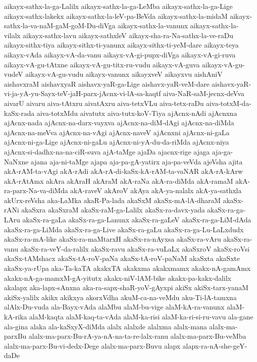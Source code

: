 {aikayx-sathx-la-ga-Lalilx
aikayx-sathx-la-ga-LeMba
aikayx-sathx-la-ga-Lige
aikayx-sathx-lakekx
aikayx-sathx-la-leV-pa-BeVda
aikayx-sathx-la-midaM
aikayx-sathx-la-va-naM-gaM-goM-Du-diVga
aikayx-sathx-la-vanunx
aikayx-sathx-la-vilalx
aikayx-sathx-lavu
aikayx-sathxleV
aikayx-sha-ra-Na-sathx-la-ve-raDu
aikayx-sithx-tiya
aikayx-sithx-ti-yanunx
aikayx-sithx-ti-yeM-dare
aikayx-teya
aikayx-vAda
aikayx-vA-da-vanu
aikayx-vA-gi-pupx-diVga
aikayx-vA-gi-ruva
aikayx-vA-gu-tAtxne
aikayx-vA-gu-titx-ru-vudu
aikayx-vA-guva
aikayx-vA-gu-vudeV
aikayx-vA-gu-vudu
aikayx-vanunx
aikayxveV
aikayxvu
aishAniV
aishavxraM
aishavxyaR
aishavx-yaR-ga-Lige
aishavx-yaR-veM-dare
aishavx-yaR-vi-ja-yA-yu-Sayx-teV-jaH-parx-jAcnx-vi-lA-sa-kaqtf
aiva-NaR-saM-jecnx-deVva
aivarU
aivaru
aiva-tAtxru
aivatAxru
aiva-tetxVLu
aiva-tetx-raDu
aiva-totxM-da-kaSx-rada
aiva-totxMdu
aivatutx
aiva-tutx-koV-Tiya
ajAcnx-nAdi
ajAcnxna
ajAcnx-nada
ajAcnx-na-darx-vayxva
ajAcnx-na-diM-dAgi
ajAcnx-na-diMda
ajAcnx-na-meVva
ajAcnx-na-vAgi
ajAcnx-naveV
ajAcnxni
ajAcnx-ni-gaLa
ajAcnx-ni-ga-Lige
ajAcnx-ni-gaLu
ajAcnx-ni-yA-du-da-riMda
ajAcnx-niya
ajAcnx-si-dadhx-na-na-ciR-suva
ajA-taMge
ajaDa
ajacnx-rige
ajaga
aja-ga-NaNxne
ajana
aja-ni-taMge
ajapa
aja-pa-gA-yatirx
aja-pa-veVda
ajeVsha
ajita
akA-rAM-ta-vAgi
akA-rAdi
akA-rA-di-kaSx-kA-rAM-ta-vaNAR
akA-rA-kArw
akA-rAtAmx
akAra
akAraH
akAraM
akA-raNa
akA-ra-diMda
akA-ramaM
akA-ra-parx-Na-va-diMda
akA-raveV
akAroV
akAya
akA-ya-nalalx
akA-ya-sathxla
akUrx-reVsha
aka-LaMka
akaR-Pa-lada
akaSxM
akaSx-mA-lA-dharaM
akaSx-rANi
akaSxra
akaSxraM
akaSx-raM-ga-Lalilx
akaSx-ra-davx-yada
akaSx-ra-ga-LAru
akaSx-ra-gaLa
akaSx-ra-ga-Lanunx
akaSx-ra-gaLeV
akaSx-ra-ga-LiM-dAda
akaSx-ra-ga-LiMda
akaSx-ra-ga-Live
akaSx-ra-gaLu
akaSx-ra-ga-Lu-LaLxdudx
akaSx-ra-mA-like
akaSx-ra-maMtarxH
akaSx-ra-nAyxsa
akaSx-ra-vAru
akaSx-ra-vanu
akaSx-ra-veY-da-ralilx
akaSx-ravu
akaSx-ra-vuLaLx
akaSxroV
akaSx-roVsi
akaSx-tAMshacx
akaSx-tA-roV-paNa
akaSx-tA-roV-paNaM
akaSxta
akaSxte
akaSx-ya-rUpa
aka-Ta-kaTA
akakxTA
akakxma
akakxmamx
akakx-nA-gamAmx
akakx-nA-ga-mamxM-gA-yitutx
akakx-niV-lAM-bike
akakx-pa-kakx-dalilx
akalapx
aka-lapx-sAnxna
aka-ra-sapx-shaR-yoV-gAyxpi
akiSx
akiSx-tarx-yanaM
akiSx-yalilx
akikx
akikxya
akorxVdha
akuM-ca-na-veMdu
aku-Ti-lA-tamxna
alAlx-Du-vuda
ala-Bayx-vAda
alaMbu
alaM-bu-vige
alaM-kA-ra-vanunx
alaM-kA-rika
alaM-kaqta
alaM-kaq-ta-vAda
alaM-ka-risi
alaM-ka-ri-si-ru-vavu
ala-gane
ala-gina
alaka
ala-kaSxyX-diMda
alalx
alalxde
alalxma
alalx-mana
alalx-ma-parxBu
alalx-ma-parx-Bu-rA-ya-nA-na-ta-re-lalx-ranu
alalx-ma-parx-Bu-veMba
alalx-ma-parx-Bu-vi-dedx-Dege
alalx-ma-parx-Buvu
alapx
alapx-ra-nA-she-geY-daDe
}
